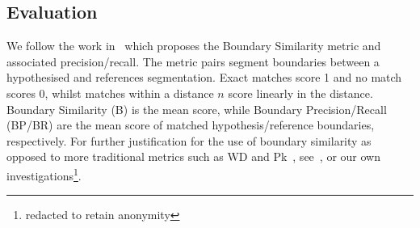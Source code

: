 \subsection{Evaluation}\label{evaluation}

We follow the work in~\cite{fournier-2013-B} which proposes the Boundary Similarity metric and associated precision/recall. The metric pairs segment boundaries between a hypothesised and references segmentation. Exact matches score 1 and no match scores 0, whilst matches within a distance $n$ score linearly in the distance. Boundary Similarity (B) is the mean score, while Boundary Precision/Recall (BP/BR) are the mean score of matched hypothesis/reference boundaries, respectively. For further justification for the use of boundary similarity as opposed to more traditional metrics such as WD and Pk~\cite{HearstW2002}, see~\cite{fournier-2013-B}, or our own investigations\footnote{redacted to retain anonymity}.
